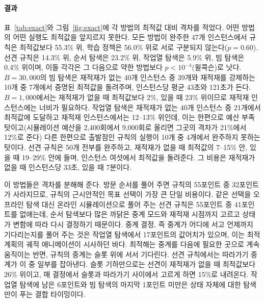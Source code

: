 \documentclass[final,5p,times,twocolumn]{elsarticle}
\begin{document}
\paragraph{결과}
표~\ref{tab:exact}와 그림~\ref{fig:exact}에 각 방법의 최적값 대비 격차를 적었다. 어떤 방법의 어떤
실행도 최적값을 앞지르지 못한다. 모든 방법이 완주한 47개 인스턴스에서 규칙은 최적값보다 55.3\%
위, 학습 정책은 56.0\% 위로 서로 구분되지 않는다($p = 0.60$). 선견 규칙은 14.3\% 위, 순서 탐색은
23.2\% 위, 작업열 탐색은 5.9\% 위, 빔 탐색은 0.4\% 위이며, 이들 각각은 그 다음으로 약한 방법보다
$p < 10^{-4}$(윌콕슨)로 낫다. $B = 30{,}000$의 빔 탐색은 재적재가 없는 40개 인스턴스 중 39개와
재적재를 강제하는 10개 중 7개에서 증명된 최적값을 돌려주며, 인스턴스당 평균 43초와 121초가 든다.
$B = 1{,}000$에서는 재적재가 없을 때 최적값보다 2\%, 있을 때 23\% 위이므로 재적재 인스턴스에는
너비가 필요하다. 작업열 탐색은 재적재가 없는 40개 인스턴스 중 21개에서 최적값에 도달하고 재적재
인스턴스에서는 12--13\% 위인데, 이는 한편으로 예산 부족 탓이고(시뮬레이션 예산을 2{,}400회에서
9{,}000회로 올리면 그곳의 격차가 21\%에서 12\%로 준다) 다른 한편으로 출발점인 규칙의 실행이 10개 중
4개에서 완주하지 못하는 탓이다. 선견 규칙은 50개 전부를 완주하고, 재적재가 없을 때 최적값의 7--15\%
안, 있을 때 19--29\% 안에 들며, 인스턴스 여섯에서 최적값을 돌려준다. 그 비용은 재적재가 없을 때
인스턴스당 33초, 있을 때 7분이다.

이 방법들은 격차를 분해해 준다. 방문 순서를 풀어 주면 규칙의 55포인트 중 32포인트가 사라지므로,
규칙의 근시안적인 목표 선택이 가장 큰 단일 비용이다. 같은 선택을 오프라인 탐색 대신 온라인
시뮬레이션으로 풀어 주는 선견 규칙은 55포인트 중 41포인트를 없애는데, 순서 탐색보다 많은 까닭은
중계 모드와 재적재 시점까지 고르고 상태가 변함에 따라 다시 결정하기 때문이다. 중계 결정, 즉 중계가
어디에 서고 언제까지 기다리는지를 풀어 주는 것은 작업열 탐색에서 17포인트의 값어치가 있으며, 이는
최적 계획의 궤적 애니메이션이 시사하던 바다. 최적해는 중계를 다음에 필요한 곳으로 계속 움직이는
반면, 규칙의 중계는 슬롯 위에 서서 기다린다. 선견 규칙에서는 따라가기 중계가 이 중 일부를 잡아낸다.
슬롯 기하만으로는 선견이 재적재가 없을 때 최적값보다 26\% 위이고, 매 결정에서 슬롯과 따라가기
사이에서 고르게 하면 15\%로 내려온다. 작업열 탐색에 남은 6포인트와 빔 탐색의 마지막 1포인트 미만은
상태 자체에 대한 탐색만이 푸는 결합 타이밍이다.
\end{document}
